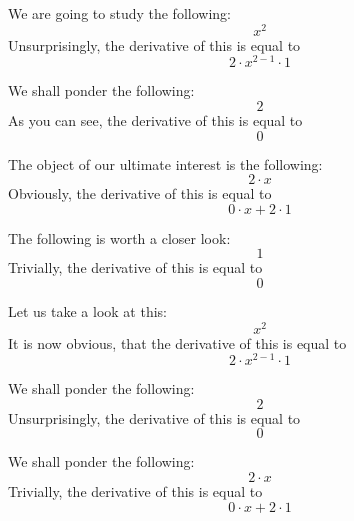 \documentclass{article}
\begin{document}
We are going to study the following:
\begin{equation}
x ^{2 } 
\end{equation}
Unsurprisingly, the derivative of this is equal to
\begin{equation}
2 \cdot x ^{2 - 1 } \cdot 1 
\end{equation}

We shall ponder the following:
\begin{equation}
2 
\end{equation}
As you can see, the derivative of this is equal to
\begin{equation}
0 
\end{equation}

The object of our ultimate interest is the following:
\begin{equation}
2 \cdot x 
\end{equation}
Obviously, the derivative of this is equal to
\begin{equation}
0 \cdot x + 2 \cdot 1 
\end{equation}

The following is worth a closer look:
\begin{equation}
1 
\end{equation}
Trivially, the derivative of this is equal to
\begin{equation}
0 
\end{equation}

Let us take a look at this:
\begin{equation}
x ^{2 } 
\end{equation}
It is now obvious, that the derivative of this is equal to
\begin{equation}
2 \cdot x ^{2 - 1 } \cdot 1 
\end{equation}

We shall ponder the following:
\begin{equation}
2 
\end{equation}
Unsurprisingly, the derivative of this is equal to
\begin{equation}
0 
\end{equation}

We shall ponder the following:
\begin{equation}
2 \cdot x 
\end{equation}
Trivially, the derivative of this is equal to
\begin{equation}
0 \cdot x + 2 \cdot 1 
\end{equation}
\end{document}

